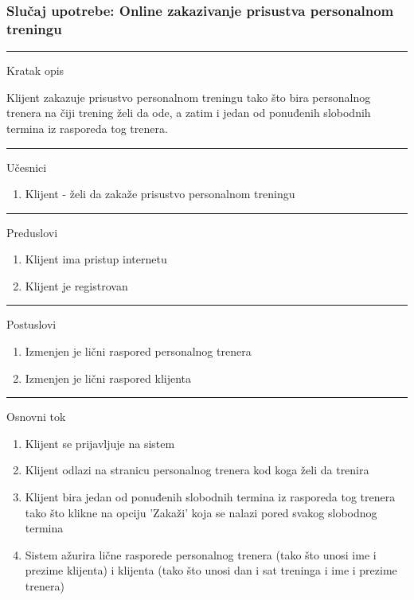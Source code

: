 \subsubsection{Slučaj upotrebe: Online zakazivanje prisustva personalnom treningu}

\begin{center}
\hrule
\vspace{0.2cm}
    \begin{center}
    Kratak opis  
    \end{center}
    Klijent zakazuje prisustvo personalnom treningu tako što bira personalnog trenera na čiji trening želi da ode, a zatim i jedan od ponuđenih slobodnih termina iz rasporeda tog trenera.
    \vspace{0.2cm}\\ 
\hrule
\vspace{0.2cm}
    Učesnici
    \begin{enumerate}
    \item  Klijent - želi da zakaže prisustvo personalnom treningu
    \end{enumerate}
\hrule
\vspace{0.2cm}
   Preduslovi 
   \begin{enumerate}
    \item Klijent ima pristup internetu
    \item Klijent je registrovan
   \end{enumerate} 
\hrule
\vspace{0.2cm}  
    Postuslovi
    \begin{enumerate}
    \item Izmenjen je lični raspored personalnog trenera
    \item Izmenjen je lični raspored klijenta
   \end{enumerate} 
\hrule
\vspace{0.2cm}
    Osnovni tok 
    \begin{enumerate}
   \item Klijent se prijavljuje na sistem
    \item Klijent odlazi na stranicu personalnog trenera kod koga želi da trenira
    \item Klijent bira jedan od ponuđenih slobodnih termina iz rasporeda tog trenera tako što klikne na opciju 'Zakaži' koja se nalazi pored svakog slobodnog termina
    \item Sistem ažurira lične rasporede personalnog trenera (tako što unosi ime i prezime klijenta) i klijenta (tako što unosi dan i sat treninga i ime i prezime trenera)

\end{enumerate}
\end{center}
